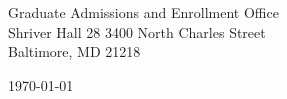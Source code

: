 \begin{minipage}{0.49\textwidth}
\begin{flushleft}
\noindent 
Graduate Admissions and Enrollment Office\\
Shriver Hall 28  3400 North Charles Street \\
Baltimore, MD 21218
\end{flushleft}
\end{minipage}
\begin{minipage}{0.47\textwidth}
\begin{flushright}
\today
\end{flushright}
\end{minipage} \\

\newcommand{\univ}{The Johns Hopkins University}
\newcommand{\univshort}{JHU}
\newcommand{\degree}{Ph.D.}
\newcommand{\dept}{Computer Science}
